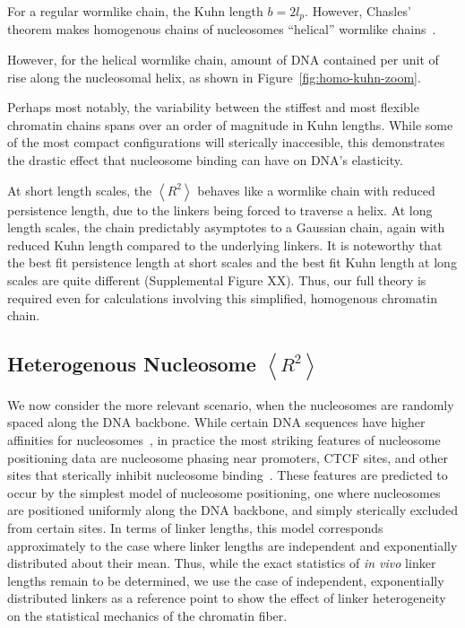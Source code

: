 \documentclass[%
 reprint,
superscriptaddress,
showpacs,preprintnumbers,
 amsmath,amssymb,
 aps,
 prl,
]{revtex4-1}
\newcommand{\RR}{\left\langle{}R^2\right\rangle{}}
\begin{document}
For a regular wormlike chain, the Kuhn length $b = 2 l_p$.
However, Chasles' theorem makes homogenous chains of nucleosomes ``helical''
    wormlike chains~\cite{yamakawa2016}.

However, for the helical wormlike chain, amount of DNA contained per unit of
    rise along the nucleosomal helix, as shown in
    Figure~\ref{fig:homo-kuhn-zoom}.

Perhaps most notably, the variability between the stiffest and most flexible
    chromatin chains spans over an order of magnitude in Kuhn lengths.
While some of the most compact configurations will sterically inaccesible, this
    demonstrates the drastic effect that nucleosome binding can have on DNA's
    elasticity.

At short length scales, the $\RR$ behaves like a wormlike chain with reduced
    persistence length, due to the linkers being forced to traverse a helix.
At long length scales, the chain predictably asymptotes to a Gaussian
    chain, again with reduced Kuhn length compared to the underlying linkers.
It is noteworthy that the best fit persistence length at short scales and the
    best fit Kuhn length at long scales are quite different (Supplemental Figure
    XX).
Thus, our full theory is required even for calculations involving this
    simplified, homogenous chromatin chain.


\subsection{\label{sec:hetero-kuhn}Heterogenous Nucleosome
\texorpdfstring{$\RR$}{<R2>}}

We now consider the more relevant scenario, when the nucleosomes are randomly
    spaced along the DNA backbone.
While certain DNA sequences have higher affinities for
    nucleosomes~\cite{something widom}, in practice the most striking features
    of nucleosome positioning data are nucleosome phasing near promoters, CTCF
    sites, and other sites that sterically inhibit nucleosome
    binding~\cite{widom1992}.
These features are predicted to occur by the simplest model of nucleosome
    positioning, one where nucleosomes are positioned uniformly along the DNA
    backbone, and simply sterically excluded from certain sites.
In terms of linker lengths, this model corresponds approximately to the case
    where linker lengths are independent and exponentially distributed about
    their mean.
Thus, while the exact statistics of \textit{in vivo} linker lengths remain to be
    determined, we use the case of independent, exponentially distributed
    linkers as a reference point to show the effect of linker heterogeneity on
    the statistical mechanics of the chromatin fiber.
\end{document}
